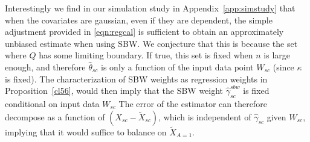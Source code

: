 \begin{remark}
        Interestingly we find in our simulation study in Appendix~\ref{app:simstudy} that when the covariates are gaussian, even if they are dependent, the simple adjustment provided in \eqref{eqn:regcal} is sufficient to obtain an approximately unbiased estimate when using SBW. We conjecture that this is because the set where $Q$ has some limiting boundary. If true, this set is fixed when $n$ is large enough, and therefore $\hat{\theta}_{sc}$ is only a function of the input data point $W_{sc}$ (since $\kappa$ is fixed). The characterization of SBW weights as regression weights in Proposition~\ref{cl56}, would then imply that the SBW weight $\hat{\gamma}_{sc}^{sbw}$ is fixed conditional on input data $W_{sc}$ %
        The error of the estimator can therefore decompose as a function of $(X_{sc} - \tilde{X}_{sc})$, which is independent of $\hat{\gamma}_{sc}$ given $W_{sc}$, implying that it would suffice to balance on $\tilde{X}_{A=1}$.
\end{remark}



